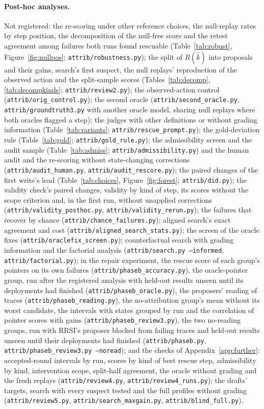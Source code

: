 \documentclass[11pt]{article}
\newcommand{\Rhat}{R(\hat{k})}
\begin{document}
\paragraph{Post-hoc analyses.} Not registered: the re-scoring under other reference choices, the null-replay rates by step position, the decomposition of the null-free score and the retest agreement among failures both runs found rescuable (Table~\ref{tab:robust}, Figure~\ref{fig:nullpos}; \texttt{attrib/robustness.py}); the split of $\Rhat$ into proposals and their gains, search's first suspect, the null replays' reproduction of the observed action and the split-sample scores (Tables~\ref{tab:decomp}, \ref{tab:decompkinds}; \texttt{attrib/review2.py}); the observed-action control (\texttt{attrib/orig\_control.py}); the second oracle (\texttt{attrib/second\_oracle.py}, \texttt{attrib/groundtruth3.py} with another oracle model, sharing null replays where both oracles flagged a step); the judges with other definitions or without grading information (Table~\ref{tab:variants}; \texttt{attrib/rescue\_prompt.py}); the gold-deviation rule (Table~\ref{tab:gold}; \texttt{attrib/gold\_rule.py}); the admissibility screen and the audit sample (Table~\ref{tab:admiss}; \texttt{attrib/admissibility.py}) and the human audit and the re-scoring without state-changing corrections (\texttt{attrib/audit\_human.py}, \texttt{attrib/audit\_rescore.py}); the paired changes of the first write's lead (Table~\ref{tab:choices}, Figure~\ref{fig:forest}; \texttt{attrib/did.py}); the validity check's paired changes, validity by kind of step, its scores without the scope criterion and, in the first run, without unapplied corrections (\texttt{attrib/validity\_posthoc.py}, \texttt{attrib/validity\_rerun.py}); the failures that recover by chance (\texttt{attrib/chance\_failures.py}); aligned search's exact agreement and cost (\texttt{attrib/aligned\_search\_stats.py}); the screen of the oracle fixes (\texttt{attrib/oraclefix\_screen.py}); counterfactual search with grading information and the factorial analysis (\texttt{attrib/search.py --informed}, \texttt{attrib/factorial.py}); in the repair experiment, the rescue score of each group's pointers on its own failures (\texttt{attrib/phaseb\_accuracy.py}), the oracle-pointer group, run after the registered analysis with held-out results unseen until its deployments had finished (\texttt{attrib/phaseb\_oracle.py}), the proposers' reading of traces (\texttt{attrib/phaseb\_reading.py}), the no-attribution group's mean without its worst candidate, the intervals with states grouped by run and the correlation of pointer scores with gains (\texttt{attrib/phaseb\_review3.py}), the two no-reading groups, run with RRSI's proposer blocked from failing traces and held-out results unseen until their deployments had finished (\texttt{attrib/phaseb.py}, \texttt{attrib/phaseb\_review3.py --noread}); and the checks of Appendix~\ref{app:further}: accepted-round intervals by run, scores by kind of best rescue step, admissibility by kind, intervention scope, split-half agreement, the oracle without grading and the fresh replays (\texttt{attrib/review4.py}, \texttt{attrib/review4\_runs.py}); the drafts' targets, search with every suspect tested and the full profiles without grading (\texttt{attrib/review5.py}, \texttt{attrib/search\_maxgain.py}, \texttt{attrib/blind\_full.py}).
\end{document}

